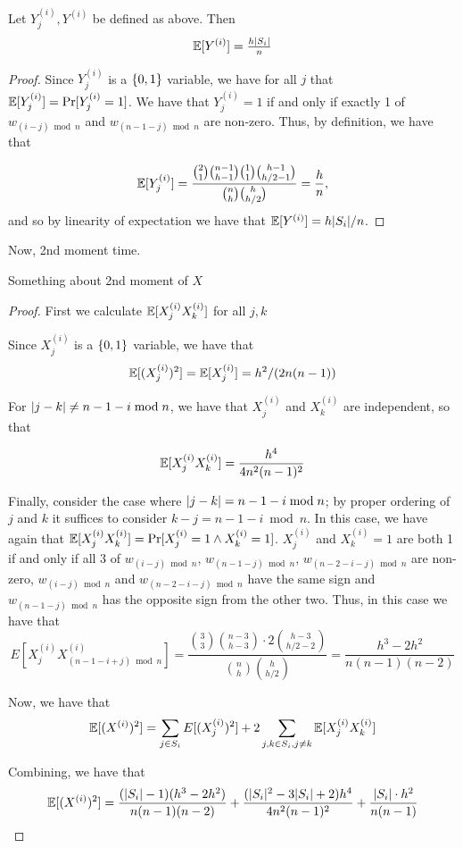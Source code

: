 \begin{lemma}
\label{lem:expof1}
Let $Y^{(i)}_j, Y^{(i)}$ be defined as above. Then 
\[\operatorname*{\mathbb{E}}[Y^{(i)}]=\tfrac{h\lvert S_i\rvert}{n}\]
\end{lemma}

\begin{proof}
Since $Y^{(i)}_j$ is a $\{0,1\}$ variable, we have for all $j$ that
$\operatorname*{\mathbb{E}}[Y^{(i)}_j]=\Pr[Y^{(i)}_j=1]$. We have that $Y^{(i)}_j=1$ if and only if exactly 1 of 
$w_{(i-j) \bmod{n}}$ and $w_{(n-1-j) \bmod{n}}$ are non-zero. Thus, by definition, we have that 

\[\operatorname*{\mathbb{E}}[Y^{(i)}_j]=\frac{\binom{2}{1}\binom{n-1}{h-1}\binom{1}{1}\binom{h-1}{h/2-1}}{\binom{n}{h}
    \binom{h}{h/2}} = \frac{h}{n},\] and so by linearity of
expectation we have that $\operatorname*{\mathbb{E}}[Y^{(i)}]=h\lvert S_i\rvert/n$.  
\end{proof}

Now, 2nd moment time. 

\begin{lemma}
Something about 2nd moment of $X$
\end{lemma}

\begin{proof}
First we calculate $\operatorname*{\mathbb{E}}[X^{(i)}_jX^{(i)}_k]$ for all $j,k$


Since $X^{(i)}_j$ is a $\{0,1\}$ variable, we have that
\[\operatorname*{\mathbb{E}}[(X^{(i)}_j)^2]=\operatorname*{\mathbb{E}}[X^{(i)}_j]=h^2/(2n(n-1))\]

For $\lvert j - k\rvert \neq n - 1 - i \bmod{n}$, we have that $X^{(i)}_j$
and $X^{(i)}_k$ are independent, so that 

\[\operatorname*{\mathbb{E}}[X^{(i)}_jX^{(i)}_k]=\frac{h^4}{4n^2(n-1)^2}\]

Finally, consider the case where $\lvert j-k\rvert = n - 1 - i \bmod{n}$; by
proper ordering of $j$ and $k$ it suffices to consider
$k-j=n-1-i\bmod{n}$. In this case, we have again that 
$\operatorname*{\mathbb{E}}[X^{(i)}_jX^{(i)}_k]=\Pr[X^{(i)}_j=1 \wedge
X^{(i)}_k=1]$. $X^{(i)}_j$ and $X^{(i)}_k=1$ are both 1 if and only if
all 3 of $w_{(i-j) \bmod{n}}$, $w_{(n-1-j) \bmod{n}}$, $w_{(n-2-i-j)
  \bmod{n}}$ are non-zero, $w_{(i-j) \bmod{n}}$ and  $w_{(n-2-i-j)
  \bmod{n}}$ have the same sign and $w_{(n-1-j) \bmod{n}}$ has the
  opposite sign from the other two. Thus, in this case we have that 
\[E[X^{(i)}_jX^{(i)}_{(n-1-i+j)\bmod{n}}]=\frac{\binom{3}{3}\binom{n-3}{h-3}\cdot
  2\binom{h-3}{h/2-2}}{\binom{n}{h}\binom{h}{h/2}}=\frac{h^3-2h^2}{n(n-1)(n-2)}\]


Now, we have that 
\[\operatorname*{\mathbb{E}}[(X^{(i)})^2]=\sum_{j \in S_i}E[(X^{(i)}_j)^2] + 2\sum_{j,k \in
    S_i, j\neq k}\operatorname*{\mathbb{E}}[X^{(i)}_jX^{(i)}_k]\]

Combining, we have that 
\[\operatorname*{\mathbb{E}}[(X^{(i)})^2]=\frac{(\lvert S_i\rvert-1)(h^3-2h^2)}{n(n-1)(n-2)}+\frac{(\lvert S_i\rvert^2-3\lvert S_i\rvert+2)h^4}{4n^2(n-1)^2}+\frac{\lvert S_i\rvert\cdot h^2}{n(n-1)}\]
\end{proof}




